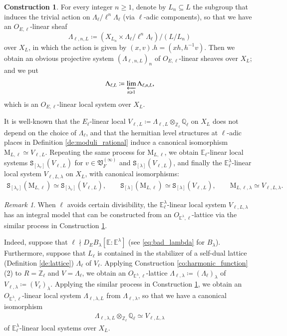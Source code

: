 \documentclass[12pt]{amsart}
\numberwithin{equation}{section}
\theoremstyle{plain}
\theoremstyle{definition}
\newtheorem{construction}[proposition]{Construction}
\theoremstyle{remark}
\newtheorem{remark}[proposition]{Remark}
\renewcommand{\d}[1]{\mathbb{#1}}
\newcommand{\f}[1]{\mathfrak{#1}}
\renewcommand{\r}[1]{\mathrm{#1}}
\renewcommand{\(}{\left(}
\renewcommand{\)}{\right)}
\renewcommand{\geq}{\geqslant}
\newcommand{\dE}{\d E}
\newcommand{\dQ}{\d Q}
\newcommand{\dZ}{\d Z}
\newcommand{\fV}{\f V}
\newcommand{\rM}{\r M}
\newcommand{\tS}{\mathtt{S}}
\begin{document}
\begin{construction}\label{co:local_system}
For every integer $n\geq 1$, denote by $L_n\subseteq L$ the subgroup that induces the trivial action on $\Lambda_\ell/\ell^n\Lambda_\ell$ (via $\ell$-adic components), so that we have an $O_{E,\ell}$-linear sheaf
\[
\Lambda_{\ell,n,L}\coloneqq\(X_{L_n}\times\Lambda_\ell/\ell^n\Lambda_\ell\)/(L/L_n)
\]
over $X_L$, in which the action is given by $(x,v).h=(xh,h^{-1}v)$. Then we obtain an obvious projective system $(\Lambda_{\ell,n,L})_n$ of $O_{E,\ell}$-linear sheaves over $X_L$; and we put
\[
\Lambda_{\ell,L}\coloneqq\varprojlim_{n\geq 1}\Lambda_{\ell,n,L},
\]
which is an $O_{E,\ell}$-linear local system over $X_L$.
\end{construction}

It is well-known that the $E_\ell$-linear local $V_{\ell,L}\coloneqq\Lambda_{\ell,L}\otimes_{\dZ_\ell}\dQ_\ell$ on $X_L$ does not depend on the choice of $\Lambda_\ell$, and that the hermitian level structures at $\ell$-adic places in Definition \ref{de:moduli_rational} induce a canonical isomorphism $\rM_{L,\ell}\simeq V_{\ell,L}$. Repeating the same process for $\rM_{L,\ell}$, we obtain $\dE_\ell$-linear local systems $\tS_{[\lambda_v]}(V_{\ell,L})$ for $v\in\fV_F^{(\infty)}$ and $\tS_{[\lambda]}(V_{\ell,L})$, and finally the $\dE^\lambda_\ell$-linear local system $V_{\ell,L,\lambda}$ on $X_L$, with canonical isomorphisms:
\begin{align}\label{eq:realization_local_system}
\tS_{[\lambda_v]}(\rM_{L,\ell})\simeq\tS_{[\lambda_v]}(V_{\ell,L}),\qquad
\tS_{[\lambda]}(\rM_{L,\ell})\simeq\tS_{[\lambda]}(V_{\ell,L}),\qquad
\rM_{L,\ell,\lambda}\simeq V_{\ell,L,\lambda}.
\end{align}



\begin{remark}\label{re:local_system_integral}
When $\ell$ avoids certain divisibility, the $\dE^\lambda_\ell$-linear local system $V_{\ell,L,\lambda}$ has an integral model that can be constructed from an $O_{\dE^\lambda,\ell}$-lattice via the similar process in Construction \ref{co:local_system}.

Indeed, suppose that $\ell\nmid D_EB_\lambda[\dE\colon\dE^\lambda]$ (see \eqref{eq:bad_lambda} for $B_\lambda$). Furthermore, suppose that $L_\ell$ is contained in the stabilizer of a self-dual lattice (Definition \ref{de:lattice}) $\Lambda_\ell$ of $V_\ell$. Applying Construction \ref{co:harmonic_function}(2) to $R=\dZ_\ell$ and $V=\Lambda_\ell$, we obtain an $O_{\dE^\lambda,\ell}$-lattice $\Lambda_{\ell,\lambda}\coloneqq(\Lambda_\ell)_\lambda$ of $V_{\ell,\lambda}\coloneqq(V_\ell)_\lambda$. Applying the similar process in Construction \ref{co:local_system}, we obtain an $O_{\dE^\lambda,\ell}$-linear local system $\Lambda_{\ell,\lambda,L}$ from $\Lambda_{\ell,\lambda}$, so that we have a canonical isomorphism
\begin{align}\label{eq:local_system_integral}
\Lambda_{\ell,\lambda,L}\otimes_{\dZ_\ell}\dQ_\ell\simeq V_{\ell,L,\lambda}
\end{align}
of $\dE^\lambda_\ell$-linear local systems over $X_L$.
\end{remark}
\end{document}
